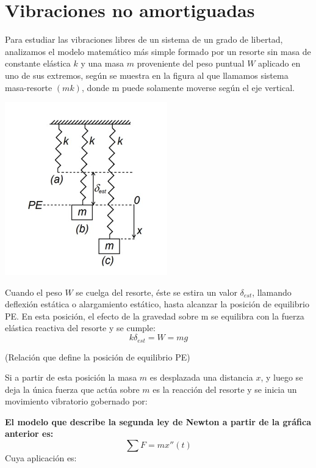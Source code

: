 \documentclass[oneside,12pt]{report}
\begin{document}
\section{Vibraciones no amortiguadas}
Para estudiar las vibraciones libres de un sistema de un grado de libertad, analizamos el modelo matemático más simple formado por un resorte sin masa de constante elástica $k$ y una masa $m $ proveniente del peso puntual $W$ aplicado en uno de sus extremos, según se muestra en la figura al que llamamos sistema masa-resorte $(mk)$, donde m puede solamente moverse según el eje vertical.
\begin{center}
	\includegraphics[width=0.4\linewidth]{imagen10}
	\end{center}

Cuando el peso $W$ se cuelga del resorte, éste se estira un valor $\delta_{est}$, llamando deflexión estática o alargamiento estático, hasta alcanzar la posición de equilibrio PE. En esta posición, el efecto de la gravedad sobre m se equilibra con la fuerza elástica reactiva del resorte y se cumple:
\begin{equation}
	k\delta_{est}=W=mg
\end{equation}

(Relación que define la posición de equilibrio PE)


Si a partir de esta posición la masa $m$ es desplazada una distancia $x$, y luego se deja la única fuerza que actúa sobre $m$ es la reacción del resorte y se inicia un movimiento vibratorio gobernado por:

\textbf{El modelo que describe la segunda ley de Newton a partir de la gráfica anterior es:}
\begin{equation}
	\sum F=mx''(t)
\end{equation}
Cuya aplicación es:
\end{document}
